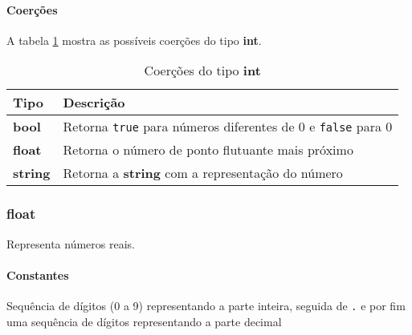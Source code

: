 \paragraph{Coerções} A tabela \ref{tab:coercoes-int} mostra as possíveis coerções do tipo \textbf{int}.
\begin{table}[!h]
    \begin{tabular}{@{}ll@{}}
        \toprule
        Tipo            & Descrição                                                                  \\ \midrule
        \textbf{bool}   & Retorna \texttt{true} para números diferentes de 0 e \texttt{false} para 0 \\
        \textbf{float}  & Retorna o número de ponto flutuante mais próximo                           \\
        \textbf{string} & Retorna a \textbf{string} com a representação do número                    \\ \bottomrule
    \end{tabular}
    \caption{Coerções do tipo \textbf{int}}
    \label{tab:coercoes-int}
\end{table}

\subsubsection{float}
Representa números reais.

\paragraph{Constantes} Sequência de dígitos (0 a 9) representando a parte inteira, seguida de \texttt{.} e por fim uma sequência de dígitos representando a parte decimal

